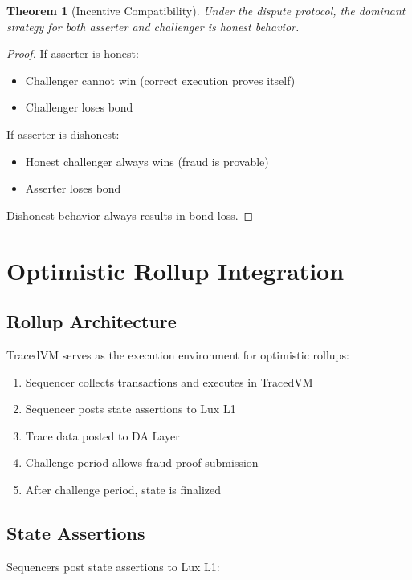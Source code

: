\documentclass[11pt,a4paper]{article}
\newtheorem{theorem}{Theorem}
\begin{document}
\begin{theorem}[Incentive Compatibility]
Under the dispute protocol, the dominant strategy for both asserter and challenger is honest behavior.
\end{theorem}

\begin{proof}
If asserter is honest:
\begin{itemize}
    \item Challenger cannot win (correct execution proves itself)
    \item Challenger loses bond
\end{itemize}
If asserter is dishonest:
\begin{itemize}
    \item Honest challenger always wins (fraud is provable)
    \item Asserter loses bond
\end{itemize}
Dishonest behavior always results in bond loss.
\end{proof}

\section{Optimistic Rollup Integration}

\subsection{Rollup Architecture}

TracedVM serves as the execution environment for optimistic rollups:

\begin{enumerate}
    \item Sequencer collects transactions and executes in TracedVM
    \item Sequencer posts state assertions to Lux L1
    \item Trace data posted to DA Layer
    \item Challenge period allows fraud proof submission
    \item After challenge period, state is finalized
\end{enumerate}

\subsection{State Assertions}

Sequencers post state assertions to Lux L1:
\end{document}
